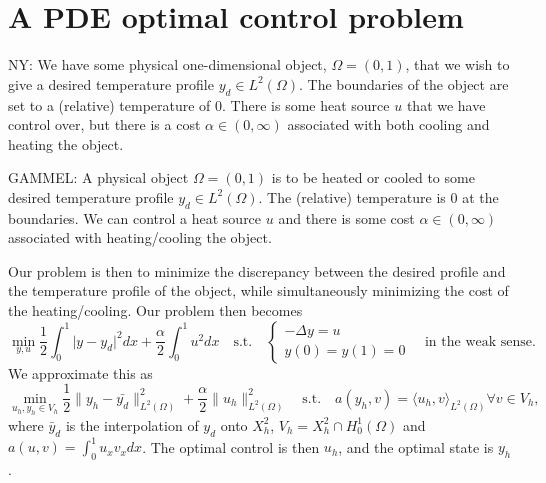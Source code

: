 \section{A PDE optimal control problem}
NY:
We have some physical one-dimensional object, $\Omega = (0, 1)$, that we wish to give a desired temperature profile $y_d \in L^2 (\Omega)$.
The boundaries of the object are set to a (relative) temperature of $0$. 
There is some heat source $u$ that we have control over, but there is a cost $\alpha \in (0, \infty)$ associated with both cooling and heating the object.

GAMMEL:
A physical object $\Omega = (0, 1)$ is to be heated or cooled to some desired temperature profile $y_d \in L^2 (\Omega)$. The (relative) temperature is $0$ at the boundaries. 
We can control a heat source $u$ and there is some cost $\alpha \in (0, \infty)$ associated with heating/cooling the object.


Our problem is then to minimize the discrepancy between the desired profile and the temperature profile of the object, while simultaneously minimizing the cost of the heating/cooling.
Our problem then becomes
\begin{equation}
    \label{eq:OCP}
    \min_{y, u} \frac{1}{2} \int_0^1 \lvert y - y_d \rvert^2 dx + \frac{\alpha}{2}\int_0^1u^2 dx
    \quad \text{s.t.} \quad \begin{cases}
       -\Delta y = u \\
       y(0) = y(1) = 0
    \end{cases} 
    \quad \text{in the weak sense.}
\end{equation}
We approximate this as 
\begin{equation}
    \label{eq:OCP_FE}
    \min_{u_h, y_h \in V_h} \frac{1}{2} \lVert y_h - \bar{y_d} \rVert_ {L^2(\Omega)}^2 + \frac{\alpha}{2} \lVert u_h \rVert_{L^2(\Omega)}^2
    \quad \text{s.t.} \quad a(y_h, v) = \langle u_h, v \rangle_{L^2(\Omega)} \forall v \in V_h,
\end{equation}
where $\bar{y}_d$ is the interpolation of $y_d$ onto $X_h^2$, $V_h = X_h^2 \cap H_0^1 (\Omega)$ and $a(u, v) = \int_0^1 u_x v_x dx$.
The optimal control is then $u_h$, and the optimal state is $y_h$.


